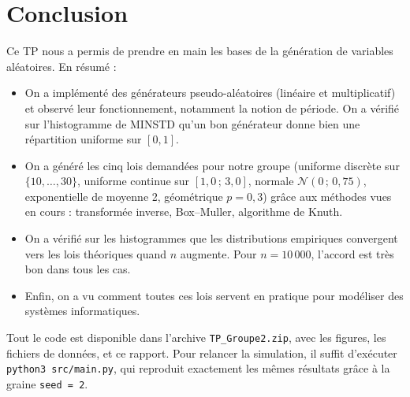 \documentclass[11pt,a4paper]{article}
\begin{document}
\section{Conclusion}

Ce TP nous a permis de prendre en main les bases de la g\'en\'eration de
variables al\'eatoires. En r\'esum\'e :

\begin{itemize}
    \item On a impl\'ement\'e des g\'en\'erateurs pseudo-al\'eatoires
          (lin\'eaire et multiplicatif) et observ\'e leur fonctionnement,
          notamment la notion de p\'eriode. On a v\'erifi\'e sur l'histogramme
          de MINSTD qu'un bon g\'en\'erateur donne bien une r\'epartition
          uniforme sur $[0, 1]$.
    \item On a g\'en\'er\'e les cinq lois demand\'ees pour notre groupe
          (uniforme discr\`ete sur $\{10, \dots, 30\}$, uniforme continue
          sur $[1{,}0\,;\, 3{,}0]$, normale $\mathcal{N}(0\,;\, 0{,}75)$,
          exponentielle de moyenne 2, g\'eom\'etrique $p = 0{,}3$) gr\^ace
          aux m\'ethodes vues en cours : transform\'ee inverse, Box--Muller,
          algorithme de Knuth.
    \item On a v\'erifi\'e sur les histogrammes que les distributions
          empiriques convergent vers les lois th\'eoriques quand $n$
          augmente. Pour $n = 10\,000$, l'accord est tr\`es bon dans tous
          les cas.
    \item Enfin, on a vu comment toutes ces lois servent en pratique pour
          mod\'eliser des syst\`emes informatiques.
\end{itemize}

Tout le code est disponible dans l'archive \texttt{TP\_Groupe2.zip}, avec
les figures, les fichiers de donn\'ees, et ce rapport. Pour relancer la
simulation, il suffit d'ex\'ecuter \texttt{python3 src/main.py}, qui
reproduit exactement les m\^emes r\'esultats gr\^ace \`a la graine
\texttt{seed = 2}.
\end{document}
